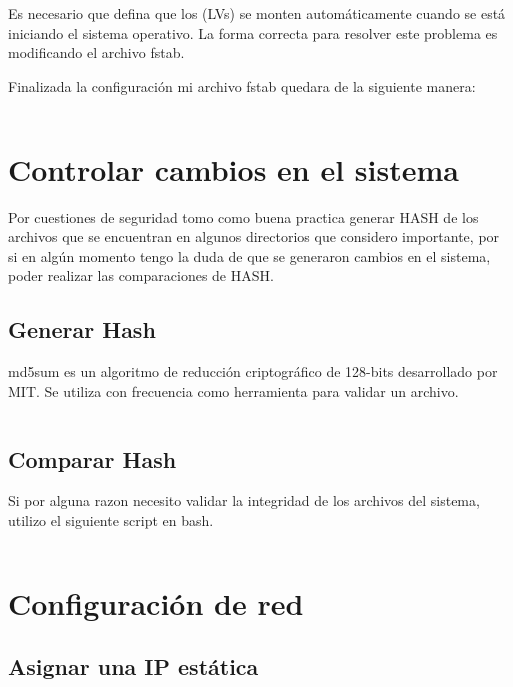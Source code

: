 				Es necesario que defina que los (LVs) se monten automáticamente cuando se está iniciando el sistema operativo. La forma correcta para resolver este problema es modificando el archivo fstab.
				
				Finalizada la configuración mi archivo fstab quedara de la siguiente manera:

				\vspace{0.3cm}
									
				\inputminted{bash}{documentos/fstab/fstab}
	
	\section{Controlar cambios en el sistema}
		
		Por cuestiones de seguridad tomo como buena practica generar HASH de los archivos que se encuentran en algunos directorios que considero importante, por si en algún momento tengo la duda de que se generaron cambios en el sistema, poder realizar las comparaciones de HASH.
	
		\clearpage
		
		\subsection{Generar Hash}
			
			md5sum es un algoritmo de reducción criptográfico de 128-bits desarrollado por MIT. Se utiliza con frecuencia como herramienta para validar un archivo.
			
			\inputminted{bash}{documentos/seguridad/generarHash.sh}
					
		
		\subsection{Comparar Hash}
			
			Si por alguna razon necesito validar la integridad de los archivos del sistema, utilizo el siguiente script en bash.
		
			\inputminted{bash}{documentos/seguridad/compararHash.sh}
			
	\section{Configuración de red}
	
		\subsection{Asignar una IP estática}
			
